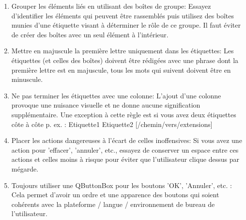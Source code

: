  \begin{enumerate}
 \item Grouper les \'el\'ements li\'es en utilisant des bo\^ites de groupe:
   Essayez d'identifier les \'el\'ements qui peuvent \^etre rassembl\'es puis utilisez des bo\^ites munies d'une \'etiquette visant \`a d\'eterminer le r\^ole de ce groupe. Il faut \'eviter de cr\'eer des bo\^ites avec un seul \'el\'ement \`a l'int\'erieur.
 \item Mettre en majuscule la premi\`ere lettre uniquement dans les \'etiquettes:
   Les \'etiquettes (et celles des bo\^ites) doivent \^etre r\'edig\'ees avec une phrase dont la premi\`ere lettre est en majuscule, tous les mots qui suivent doivent \^etre en minuscule.
 \item Ne pas terminer les \'etiquettes avec une colonne:
   L'ajout d'une colonne provoque une nuisance visuelle et ne donne aucune signification suppl\'ementaire. Une exception \`a cette r\`egle est si vous avez deux \'etiquettes c\^ote \`a c\^ote p. ex. : Etiquette1  Etiquette2 [/chemin/vers/extensions]
 \item Placer les actions dangereuses \`a l'\'ecart de celles inoffensives:
   Si vous avez une action pour 'effacer', 'annuler', etc., essayez de conserver un espace entre ces actions et celles moins \`a risque pour \'eviter que l'utilisateur clique dessus par m\'egarde.
 \item Toujours utiliser une QButtonBox pour les boutons 'OK', 'Annuler', etc. :
   Cela permet d'avoir un ordre et une apparence des boutons qui soient coh\'erents avec la plateforme / langue / environnement de bureau de l'utilisateur.
 \end{enumerate}
